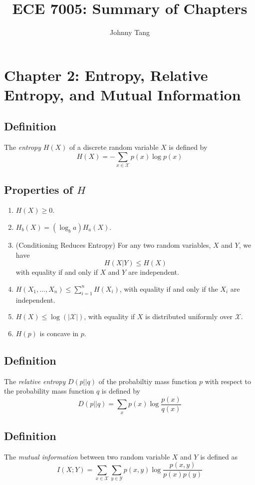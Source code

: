 \documentclass{article}
\title{ECE 7005: Summary of Chapters}
\author{Johnny Tang}
\begin{document}
\section*{Chapter 2: Entropy, Relative Entropy, and Mutual Information}
\subsection*{Definition} The \textit{entropy} $H(X)$ of a discrete random variable $X$ is defined by
\begin{equation}
H(X) = -\sum_{x\in \mathcal{X}}p(x)\log p(x)
\end{equation}
\subsection*{Properties of $H$}
\begin{enumerate}
\item $H(X)\geq 0$.
\item $H_b(X)=(\log_ba) H_a(X)$.
\item (Conditioning Reduces Entropy) For any two random variables, $X$ and $Y$, we have \begin{equation}
H(X|Y)\leq H(X)
\end{equation} with equality if and only if $X$ and $Y$ are independent.
\item $H(X_1,...,X_n)\leq \sum_{i=1}^{n} H(X_i)$, with equality if and only if the $X_i$ are independent.
\item $H(X)\leq \log (|\mathcal{X}|)$, with equality if $X$ is distributed uniformly over $\mathcal{X}$.
\item $H(p)$ is concave in $p$.
\end{enumerate}
\subsection*{Definition}
The \textit{relative entropy} $D(p||q)$ of the probabiltiy mass function $p$ with respect to the probability mass function $q$ is defined by \begin{equation}
D(p||q)=\sum_xp(x)\log \frac{p(x)}{q(x)}
\end{equation}
\subsection*{Definition}
The \textit{mutual information} between two random variable $X$ and $Y$ is defined as \begin{equation}
I(X;Y)=\sum_{x\in \mathcal{X}} \sum_{y\in \mathcal{Y}} p(x,y)\log \frac{p(x,y)}{p(x)p(y)}
\end{equation}
\end{document}
